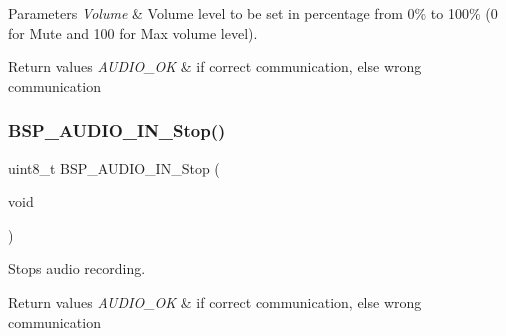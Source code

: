 \begin{DoxyParams}{Parameters}
{\em Volume} & Volume level to be set in percentage from 0\% to 100\% (0 for Mute and 100 for Max volume level). \\
\hline
\end{DoxyParams}

\begin{DoxyRetVals}{Return values}
{\em A\+U\+D\+I\+O\+\_\+\+OK} & if correct communication, else wrong communication \\
\hline
\end{DoxyRetVals}
\mbox{\label{group___s_t_m32_f4___d_i_s_c_o_v_e_r_y___a_u_d_i_o___i_n___exported___functions_ga71122b966773b01c8a5933c76f3f12fe}} 
\subsubsection{\texorpdfstring{B\+S\+P\+\_\+\+A\+U\+D\+I\+O\+\_\+\+I\+N\+\_\+\+Stop()}{BSP\_AUDIO\_IN\_Stop()}}
{\footnotesize\ttfamily uint8\+\_\+t B\+S\+P\+\_\+\+A\+U\+D\+I\+O\+\_\+\+I\+N\+\_\+\+Stop (\begin{DoxyParamCaption}\item[{void}]{ }\end{DoxyParamCaption})}



Stops audio recording. 


\begin{DoxyRetVals}{Return values}
{\em A\+U\+D\+I\+O\+\_\+\+OK} & if correct communication, else wrong communication \\
\hline
\end{DoxyRetVals}
